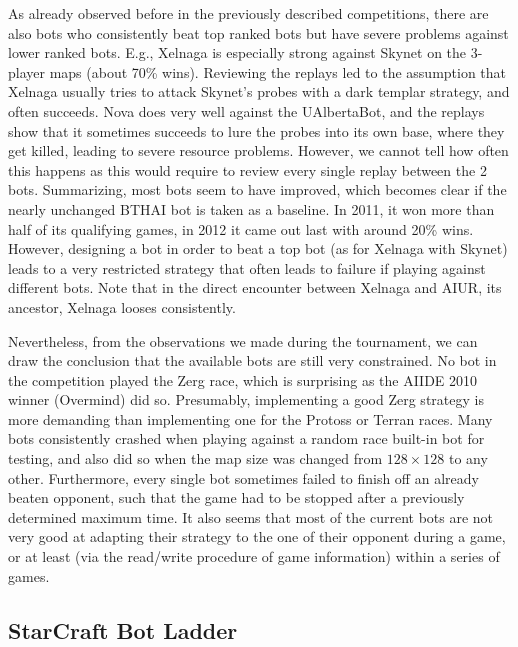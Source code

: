 \documentclass[journal]{IEEEtran}
\begin{document}
As already observed before in the previously described competitions,
there are also bots who consistently beat top ranked bots but have
severe problems against lower ranked bots. E.g., Xelnaga is especially
strong against Skynet on the 3-player maps (about 70\% wins). Reviewing
the replays led to the assumption that Xelnaga usually tries to attack
Skynet's probes with a dark templar strategy, and often succeeds. 
Nova does very well against the UAlbertaBot, and the replays show
that it sometimes succeeds to lure the probes into its own base, where
they get killed, leading to severe resource problems. However, we cannot
tell how often this happens as this would require to review every single
replay between the 2 bots. Summarizing, most bots seem to have improved,
which becomes clear if the nearly unchanged BTHAI bot is taken as a baseline.
In 2011, it won more than half of its qualifying games, in 2012 it came
out last with around 20\% wins. However, designing a bot in order to 
beat a top bot (as for Xelnaga with Skynet) leads to a very restricted
strategy that often leads to failure if playing against different bots.
Note that in the direct encounter between Xelnaga and AIUR, its ancestor,
Xelnaga looses consistently.

Nevertheless, from the observations we made during the tournament,
we can draw the conclusion that the available bots are still 
very constrained. No bot in the competition played the Zerg race,
which is surprising as the AIIDE 2010 winner (Overmind) did so.
Presumably, implementing a good Zerg strategy is more demanding
than implementing one for the Protoss or Terran races. Many bots consistently crashed
when playing against a random race built-in bot for testing, and
also did so when the map size was changed from $128\times 128$ to 
any other. Furthermore, every single bot sometimes failed to finish
off an already beaten opponent, such that the game had to be stopped
after a previously determined maximum time. It also seems that most of
the current bots are not very good at adapting their strategy to the
one of their opponent during a game, or at least (via the read/write
procedure of game information) within a series of games.



\subsection{StarCraft Bot Ladder}\label{sec:ladder}
\end{document}
